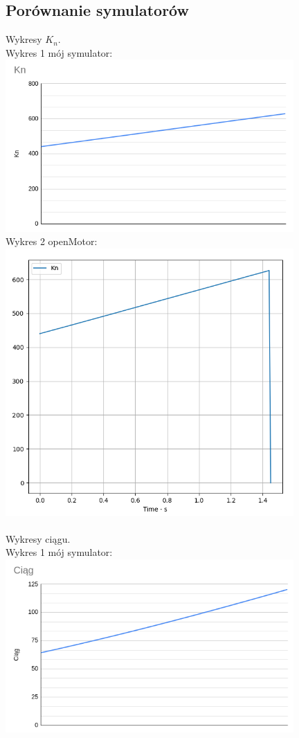 \documentclass{article}
\begin{document}
\subsection*{Porównanie symulatorów}
Wykresy $K_n$.\\ Wykres 1 mój symulator:\\
\includegraphics[width=11cm]{moje1}\\
Wykres 2 openMotor:\\
\includegraphics[width=11cm]{openMotor1}\\\\
Wykresy ciągu.\\ Wykres 1 mój symulator:\\
\includegraphics[width=11cm]{moje2}\\
\end{document}
